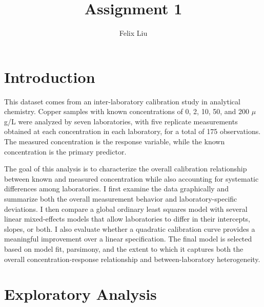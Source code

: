 \documentclass[
]{article}
\title{Assignment 1}
\author{Felix Liu}
\date{}
\begin{document}
\maketitle

\section{Introduction}\label{introduction}

This dataset comes from an inter-laboratory calibration study in
analytical chemistry. Copper samples with known concentrations of 0, 2,
10, 50, and 200 \(\mu\)g/L were analyzed by seven laboratories, with
five replicate measurements obtained at each concentration in each
laboratory, for a total of 175 observations. The measured concentration
is the response variable, while the known concentration is the primary
predictor.

The goal of this analysis is to characterize the overall calibration
relationship between known and measured concentration while also
accounting for systematic differences among laboratories. I first
examine the data graphically and summarize both the overall measurement
behavior and laboratory-specific deviations. I then compare a global
ordinary least squares model with several linear mixed-effects models
that allow laboratories to differ in their intercepts, slopes, or both.
I also evaluate whether a quadratic calibration curve provides a
meaningful improvement over a linear specification. The final model is
selected based on model fit, parsimony, and the extent to which it
captures both the overall concentration-response relationship and
between-laboratory heterogeneity.

\section{Exploratory Analysis}\label{exploratory-analysis}
\end{document}

